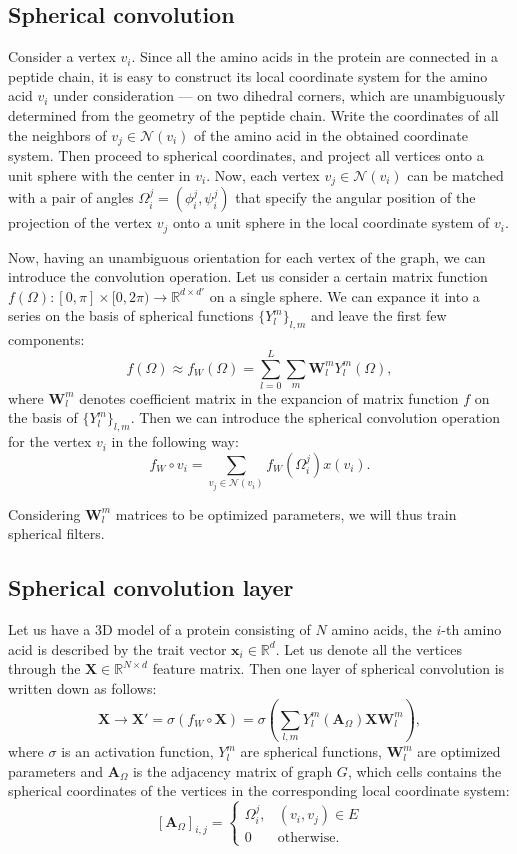 \documentclass[12pt,twoside]{article}
\begin{document}
	\subsection{Spherical convolution}
	Consider a vertex $v_i$. Since all the amino acids in the protein are connected in a peptide chain, it is easy to
	construct its local coordinate system for the amino acid $v_i$ under consideration — on two dihedral corners,
	which are unambiguously determined from the geometry of the peptide chain. Write the coordinates of all the neighbors of $v_j \in \mathcal{N}(v_i)$
	of the amino acid in the obtained coordinate system. Then proceed to spherical coordinates, and project all vertices onto a unit sphere
	with the center in $v_i$. Now, each vertex $v_j \in \mathcal{N}(v_i)$ can be matched with a pair of angles $\Omega_i^j = (\phi_i^j, \psi_i^j)$ that specify the
	angular position of the projection of the vertex $v_j$ onto a unit sphere in the local coordinate system of $v_i$.

	Now, having an unambiguous orientation for each vertex of the graph, we can introduce the convolution operation. Let us consider a certain 
	matrix function $f(\Omega) : [0, \pi] \times [0, 2\pi) \rightarrow \mathbb{R}^{d \times d'} $ on a single sphere. We can expance it
	into a series on the basis of spherical functions $\{Y_l^m\}_{l,m}$ and leave the first few components:
	$$
		f(\Omega) \approx f_W(\Omega) = \sum_{l=0}^{L}\sum_m \boldsymbol{W}_l^m Y_l^m(\Omega),
	$$
	where $\boldsymbol{W}_l^m$ denotes coefficient matrix in the expancion of matrix function $f$ on the basis of $\{Y_l^m\}_{l,m}$. Then
	we can introduce the spherical convolution operation for the vertex $v_i$ in the following way:
	$$f_W \circ v_i = \sum_{v_j \in \mathcal{N}(v_i)} f_W(\Omega_i^j)x(v_i).$$

	Considering $\boldsymbol{W}_l^m$ matrices to be optimized parameters, we will thus train spherical filters.

	\subsection{Spherical convolution layer}
	Let us have a 3D model of a protein consisting of $N$ amino acids, the $i$-th amino acid is described by the trait vector $\boldsymbol{x}_i \in \mathbb{R}^d$.
	Let us denote all the vertices through the $\boldsymbol{X} \in \mathbb{R}^{N \times d}$ feature matrix. Then one layer of spherical
	convolution is written down as follows:
	$$
		\boldsymbol{X} \longrightarrow \boldsymbol{X}' = \sigma(f_W \circ \boldsymbol{X}) = \sigma\left(\sum_{l,m}Y_l^m(\boldsymbol{A}_\Omega)\boldsymbol{X}\boldsymbol{W}_l^m\right),
	$$
	where $\sigma$ is an activation function, $Y_l^m$ are spherical functions, $\boldsymbol{W}_l^m$ are optimized parameters and $\boldsymbol{A}_\Omega$
	is the adjacency matrix of graph $G$, which cells contains the spherical coordinates of the vertices in the corresponding local coordinate system:
	$$
		[\boldsymbol{A}_\Omega]_{i,j} = \begin{cases}
			\Omega_i^j, & (v_i, v_j) \in E \\
			0 & \text{otherwise}.
		\end{cases}
	$$
\end{document}
